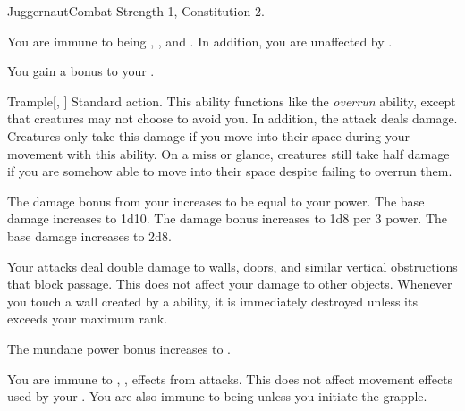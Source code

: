     \begin{feat}{Juggernaut}{Combat}
        \featpre Strength 1, Constitution 2.

         You are immune to being \slowed, \immobilized, and \paralyzed.
        In addition, you are unaffected by .

         You gain a  bonus to your .

        \begin{activeability}{Trample}[, ]
            \abilityusagetime Standard action.
            \rankline
            This ability functions like the \textit{overrun} ability, except that creatures may not choose to avoid you.
            In addition, the attack deals  damage.
            Creatures only take this damage if you move into their space during your movement with this ability.
            On a miss or glance, creatures still take half damage if you are somehow able to move into their space despite failing to overrun them.

            \rankline
             The damage bonus from your  increases to be equal to your power.
             The base damage increases to 1d10.
             The damage bonus increases to 1d8 per 3 power.
             The base damage increases to 2d8.
        \end{activeability}

         Your attacks deal double damage to walls, doors, and similar vertical obstructions that block passage.
        This does not affect your damage to other objects.
        Whenever you touch a wall created by a  ability, it is immediately destroyed unless its  exceeds your maximum rank.

         The mundane power bonus increases to .

         You are immune to , ,  effects from attacks.
        This does not affect movement effects used by your .
        You are also immune to being \grappled unless you initiate the grapple.
    \end{feat}

